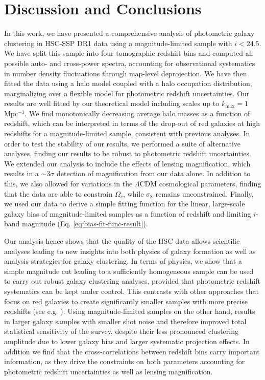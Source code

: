 \documentclass[a4paper,11pt]{article}
\begin{document}
\section{Discussion and Conclusions}\label{sec:discussion}
  In this work, we have presented a comprehensive analysis of photometric galaxy clustering in HSC-SSP DR1 data using a magnitude-limited sample with $i<24.5$. We have split this sample into four tomographic redshift bins and computed all possible auto- and cross-power spectra, accounting for observational systematics in number density fluctuations through map-level deprojection. We have then fitted the data using a halo model coupled with a halo occupation distribution, marginalizing over a flexible model for photometric redshift uncertainties. Our results are well fitted by our theoretical model including scales up to $k_{\mathrm{max}} = 1$ Mpc$^{-1}$. We find monotonically decreasing average halo masses as a function of redshift, which can be interpreted in terms of the drop-out of red galaxies at high redshifts for a magnitude-limited sample, consistent with previous analyses. In order to test the stability of our results, we performed a suite of alternative analyses, finding our results to be robust to photometric redshift uncertainties. We extended our analysis to include the effects of lensing magnification, which results in a $\sim 3 \sigma$ detection of magnification from our data alone. In addition to this, we also allowed for variations in the $\Lambda$CDM cosmological parameters, finding that the data are able to constrain $\Omega_{c}$, while $\sigma_{8}$ remains unconstrained. Finally, we used our data to derive a simple fitting function for the linear, large-scale galaxy bias of magnitude-limited samples as a function of redshift and limiting $i$-band magnitude (Eq. \ref{eq:bias-fit-func-result}).

  Our analysis hence shows that the quality of the HSC data allows scientific analyses leading to new insights into both physics of galaxy formation as well as analysis strategies for galaxy clustering. In terms of physics, we show that a simple magnitude cut leading to a sufficiently homogeneous sample can be used to carry out robust galaxy clustering analyses, provided that photometric redshift systematics can be kept under control. This contrasts with other approaches that focus on red galaxies to create significantly smaller samples with more precise redshifts (see e.g. \cite{1507.05460,1807.10163}). Using magnitude-limited samples on the other hand, results in larger galaxy samples with smaller shot noise and therefore improved total statistical sensitivity of the survey, despite their less pronounced clustering amplitude due to lower galaxy bias and larger systematic projection effects. In addition we find that the cross-correlations between redshift bins carry important information, as they drive the constraints on both parameters accounting for photometric redshift uncertainties as well as lensing magnification.
\end{document}

